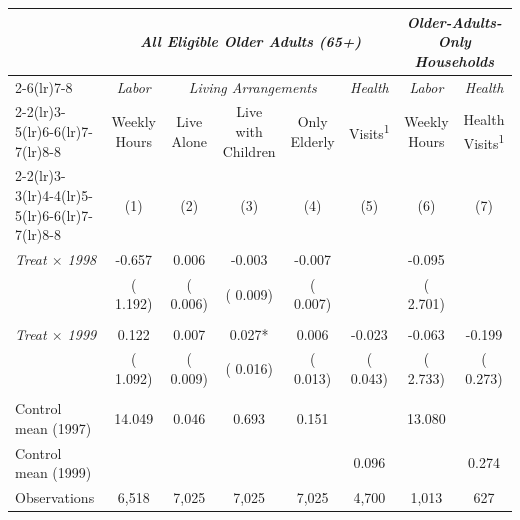\begin{tabular}{lccccccc} \hline \hline
& \multicolumn{5}{c}{\textit{All Eligible Older Adults (65+)}} & \multicolumn{2}{c}{\textit{Older-Adults-Only Households}} \\ \cmidrule(lr){2-6}\cmidrule(lr){7-8}
& \multicolumn{1}{c}{\textit{Labor}} & \multicolumn{3}{c}{\textit{Living Arrangements}} & \multicolumn{1}{c}{\textit{Health}} & \multicolumn{1}{c}{\textit{Labor}} & \multicolumn{1}{c}{\textit{Health}} \\ \cmidrule(lr){2-2}\cmidrule(lr){3-5}\cmidrule(lr){6-6}\cmidrule(lr){7-7}\cmidrule(lr){8-8}
& \multicolumn{1}{c}{Weekly Hours} & \multicolumn{1}{c}{Live Alone} & \multicolumn{1}{c}{Live with Children} & \multicolumn{1}{c}{Only Elderly} & \multicolumn{1}{c}{Visits\textsuperscript{1}} & \multicolumn{1}{c}{Weekly Hours} & \multicolumn{1}{c}{Health Visits\textsuperscript{1}} \\ 
\cmidrule(lr){2-2}\cmidrule(lr){3-3}\cmidrule(lr){4-4}\cmidrule(lr){5-5}\cmidrule(lr){6-6}\cmidrule(lr){7-7}\cmidrule(lr){8-8}
& \multicolumn{1}{c}{(1)} & \multicolumn{1}{c}{(2)} & \multicolumn{1}{c}{(3)} & \multicolumn{1}{c}{(4)} & \multicolumn{1}{c}{(5)} & \multicolumn{1}{c}{(6)} & \multicolumn{1}{c}{(7)} \\ \toprule
\textit{Treat $\times$ 1998} & -0.657 & 0.006 & -0.003 & -0.007 & & -0.095 & \\ 
 & (    1.192) & (    0.006) & (    0.009) & (    0.007) & & (    2.701) & \\ 
  & & & & & & & \\ 
\textit{Treat $\times$ 1999} & 0.122 & 0.007 & 0.027* & 0.006 & -0.023 & -0.063 & -0.199 \\ 
 & (    1.092) & (    0.009) & (    0.016) & (    0.013) & (    0.043) & (    2.733) & (    0.273) \\ 
  & & & & & & & \\ 
Control mean (1997) &    14.049 &     0.046 &     0.693 &     0.151 & &    13.080 & \\ 
Control mean (1999) & & & & &     0.096 & &     0.274 \\ 
Observations &        6,518 &        7,025 &        7,025 &        7,025 &        4,700 &        1,013 &          627 \\ 
\bottomrule
\end{tabular}